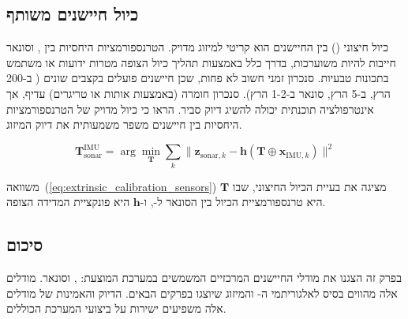\subsection{כיול חיישנים משותף}
\label{sec:sensor_calibration}

כיול חיצוני () בין החיישנים הוא קריטי למיזוג מדויק. הטרנספורמציות היחסיות בין ,  וסונאר חייבות להיות משוערכות, בדרך כלל באמצעות תהליך כיול הצופה מטרות ידועות או משתמש בתכונות טבעיות. סנכרון זמני חשוב לא פחות, שכן חיישנים פועלים בקצבים שונים ( ב-200 הרץ,  ב-5 הרץ, סונאר ב-1-2 הרץ). סנכרון חומרה (באמצעות אותות  או טריגרים) עדיף, אך אינטרפולציה תוכנתית יכולה להשיג דיוק סביר. \citet{Julier1997CovarianceIntersection} הראו כי כיול מדויק של הטרנספורמציות היחסיות בין חיישנים משפר משמעותית את דיוק המיזוג.

\begin{equation}
\mathbf{T}_{\text{sonar}}^{\text{IMU}} = \arg\min_{\mathbf{T}} \sum_{k} \| \mathbf{z}_{\text{sonar}, k} - \mathbf{h}(\mathbf{T} \oplus \mathbf{x}_{\text{IMU}, k}) \|^2
\label{eq:extrinsic_calibration_sensors}
\end{equation}

משוואה~(\ref{eq:extrinsic_calibration_sensors}) מציגה את בעיית הכיול החיצוני, שבו $\mathbf{T}$ היא טרנספורמציית הכיול בין הסונאר ל-, ו-$\mathbf{h}$ היא פונקציית המדידה הצופה.

\subsection{סיכום}
\label{sec:sensors_summary}

בפרק זה הצגנו את מודלי החיישנים המרכזיים המשמשים במערכת המוצעת: ,  וסונאר. מודלים אלה מהווים בסיס לאלגוריתמי ה- והמיזוג שיוצגו בפרקים הבאים. הדיוק והאמינות של מודלים אלה משפיעים ישירות על ביצועי המערכת הכוללים.

